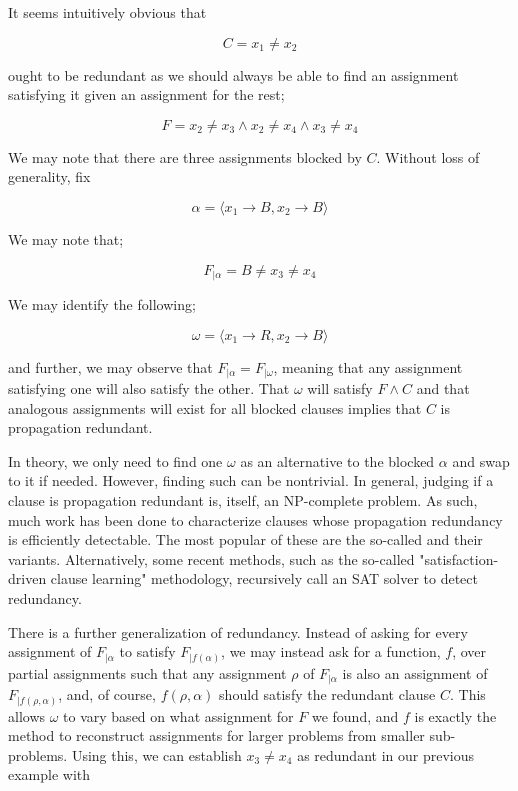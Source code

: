 It seems intuitively obvious that

\begin{equation}
    C = x_1 \neq x_2
\end{equation}

ought to be redundant as we should always be able to find an assignment satisfying it given an assignment for the rest;

\begin{equation}
    F = x_2 \neq x_3 \wedge x_2 \neq x_4\wedge x_3 \neq x_4 
\end{equation}

We may note that there are three assignments blocked by $C$. Without loss of generality, fix

\begin{equation}
    \alpha = \langle x_1 \rightarrow B, x_2 \rightarrow B\rangle
\end{equation}

We may note that;

\begin{equation}
    F_{|\alpha} = B \neq x_3 \neq x_4
\end{equation}

We may identify the following;

\begin{equation}
    \omega = \langle x_1 \rightarrow R, x_2 \rightarrow B\rangle
\end{equation}

and further, we may observe that $F_{|\alpha} = F_{|\omega}$, meaning that any assignment satisfying one will also satisfy the other. That $\omega$ will satisfy $F \wedge C$ and that analogous assignments will exist for all blocked clauses implies that $C$ is propagation redundant.

In theory, we only need to find one $\omega$ as an alternative to the blocked $\alpha$ and swap to it if needed. However, finding such can be nontrivial. In general, judging if a clause is propagation redundant is, itself, an NP-complete problem. As such, much work has been done to characterize clauses whose propagation redundancy is efficiently detectable. The most popular of these are the so-called  and their variants. Alternatively, some recent methods, such as the so-called "satisfaction-driven clause learning" methodology, recursively call an SAT solver to detect redundancy.

There is a further generalization of redundancy. Instead of asking for every assignment of $F_{|\alpha}$ to satisfy $F_{|f(\alpha)}$, we may instead ask for a function, $f$, over partial assignments such that any assignment $\rho$ of $F_{|\alpha}$ is also an assignment of $F_{|f(\rho, \alpha)}$, and, of course, $f(\rho, \alpha)$ should satisfy the redundant clause $C$. This allows $\omega$ to vary based on what assignment for $F$ we found, and $f$ is exactly the method to reconstruct assignments for larger problems from smaller sub-problems. Using this, we can establish $x_3 \neq x_4$ as redundant in our previous example with 

